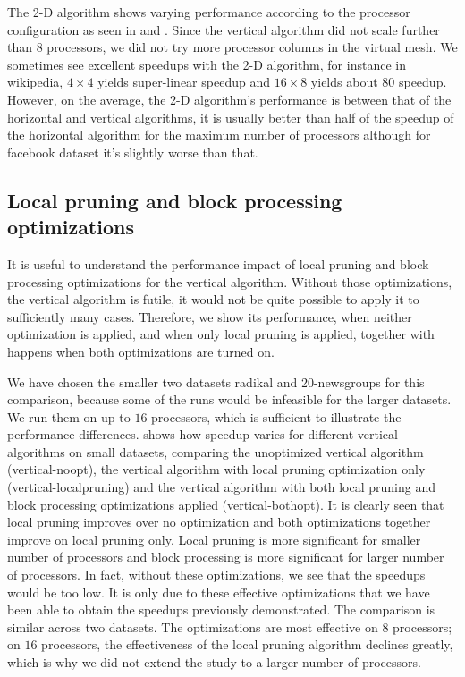 \documentclass{comjnl}
\begin{document}
The 2-D algorithm
shows varying performance according to the processor
configuration as seen in   and  . Since the vertical algorithm did not scale further than
$8$ processors, we did not try more processor columns in the virtual
mesh. We sometimes see excellent speedups with the 2-D algorithm, for
instance in wikipedia, $4 \times 4$ yields super-linear speedup and
$16 \times 8$ yields about $80$ speedup. However, on the average, the
2-D algorithm's performance is between that of the horizontal and
vertical algorithms, it is usually better than half of the speedup of
the horizontal algorithm for the maximum number of processors although
for facebook dataset it's slightly worse than that.


\subsection{Local pruning and block processing optimizations}


It is useful to understand the performance impact of local pruning and
block processing optimizations for the vertical algorithm. Without
those optimizations, the vertical algorithm is futile, it would not be
quite possible to apply it to sufficiently many cases. Therefore, we
show its performance, when neither optimization is applied, and when
only local pruning is applied, together with happens when both
optimizations are turned on.

We have chosen the smaller two datasets radikal and 20-newsgroups for
this comparison, because some of the runs would be infeasible for the
larger datasets. We run them on up to $16$ processors, which is
sufficient to illustrate the performance differences.
 shows how speedup varies for different
vertical algorithms on small datasets, comparing the unoptimized
vertical algorithm (vertical-noopt), the vertical algorithm with local
pruning optimization only (vertical-localpruning) and the vertical
algorithm with both local pruning and block processing optimizations
applied (vertical-bothopt). It is clearly seen that local pruning
improves over no optimization and both optimizations together improve
on local pruning only. Local pruning is more significant for smaller
number of processors and block processing is more significant for
larger number of processors. In fact, without these optimizations, we
see that the speedups would be too low. It is only due to these effective
optimizations that we have been able to obtain the speedups previously
demonstrated. The comparison is similar across two datasets. The
optimizations are most effective on $8$ processors; on $16$
processors, the effectiveness of the local pruning algorithm declines
greatly, which is why we did not extend the study to a larger number
of processors. 
\end{document}
